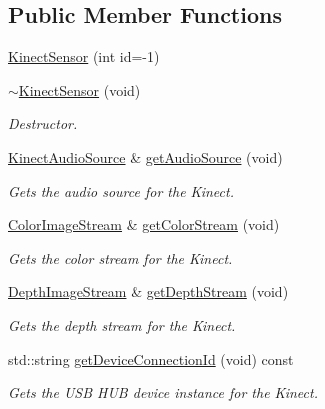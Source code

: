 \subsection*{\-Public \-Member \-Functions}
\begin{DoxyCompactItemize}
\item 
\hyperlink{class_kinect_sensor_adc33dfe7d56e637557a8149911656ccb}{\-Kinect\-Sensor} (int id=-\/1)
\item 
\hypertarget{class_kinect_sensor_a69a0df3c693ea209913512e54998a165}{\hyperlink{class_kinect_sensor_a69a0df3c693ea209913512e54998a165}{$\sim$\-Kinect\-Sensor} (void)}\label{class_kinect_sensor_a69a0df3c693ea209913512e54998a165}

\begin{DoxyCompactList}\small\item\em \-Destructor. \end{DoxyCompactList}\item 
\hyperlink{class_kinect_audio_source}{\-Kinect\-Audio\-Source} \& \hyperlink{class_kinect_sensor_a53a200893268a24d1f8206e9056717b7}{get\-Audio\-Source} (void)
\begin{DoxyCompactList}\small\item\em \-Gets the audio source for the \-Kinect. \end{DoxyCompactList}\item 
\hyperlink{class_color_image_stream}{\-Color\-Image\-Stream} \& \hyperlink{class_kinect_sensor_ace38f6492c07319cff8aaba3a974af01}{get\-Color\-Stream} (void)
\begin{DoxyCompactList}\small\item\em \-Gets the color stream for the \-Kinect. \end{DoxyCompactList}\item 
\hyperlink{class_depth_image_stream}{\-Depth\-Image\-Stream} \& \hyperlink{class_kinect_sensor_ad818040c29261cf2aa9b667fdc5da650}{get\-Depth\-Stream} (void)
\begin{DoxyCompactList}\small\item\em \-Gets the depth stream for the \-Kinect. \end{DoxyCompactList}\item 
std\-::string \hyperlink{class_kinect_sensor_aa4f00fed5673c3d51af416f1d6b4cc41}{get\-Device\-Connection\-Id} (void) const 
\begin{DoxyCompactList}\small\item\em \-Gets the \-U\-S\-B \-H\-U\-B device instance for the \-Kinect. \end{DoxyCompactList}\item 

\end{DoxyCompactItemize}
